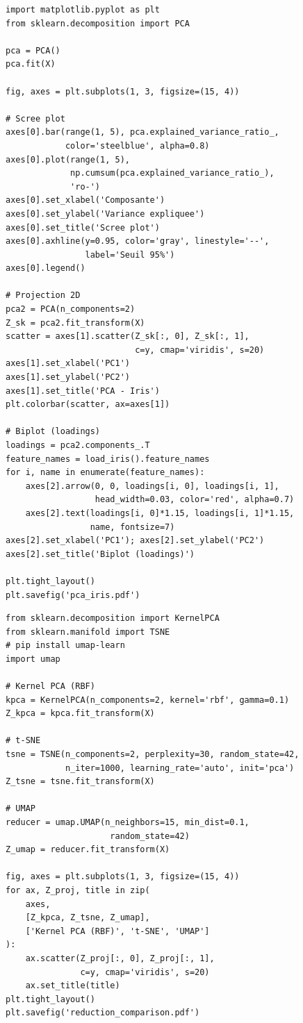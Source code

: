 \begin{codeblock}[title=\textbf{PCA avec scikit-learn et scree plot}]
\begin{verbatim}
import matplotlib.pyplot as plt
from sklearn.decomposition import PCA

pca = PCA()
pca.fit(X)

fig, axes = plt.subplots(1, 3, figsize=(15, 4))

# Scree plot
axes[0].bar(range(1, 5), pca.explained_variance_ratio_,
            color='steelblue', alpha=0.8)
axes[0].plot(range(1, 5),
             np.cumsum(pca.explained_variance_ratio_),
             'ro-')
axes[0].set_xlabel('Composante')
axes[0].set_ylabel('Variance expliquee')
axes[0].set_title('Scree plot')
axes[0].axhline(y=0.95, color='gray', linestyle='--',
                label='Seuil 95%')
axes[0].legend()

# Projection 2D
pca2 = PCA(n_components=2)
Z_sk = pca2.fit_transform(X)
scatter = axes[1].scatter(Z_sk[:, 0], Z_sk[:, 1],
                          c=y, cmap='viridis', s=20)
axes[1].set_xlabel('PC1')
axes[1].set_ylabel('PC2')
axes[1].set_title('PCA - Iris')
plt.colorbar(scatter, ax=axes[1])

# Biplot (loadings)
loadings = pca2.components_.T
feature_names = load_iris().feature_names
for i, name in enumerate(feature_names):
    axes[2].arrow(0, 0, loadings[i, 0], loadings[i, 1],
                  head_width=0.03, color='red', alpha=0.7)
    axes[2].text(loadings[i, 0]*1.15, loadings[i, 1]*1.15,
                 name, fontsize=7)
axes[2].set_xlabel('PC1'); axes[2].set_ylabel('PC2')
axes[2].set_title('Biplot (loadings)')

plt.tight_layout()
plt.savefig('pca_iris.pdf')
\end{verbatim}
\end{codeblock}

\begin{codeblock}[title=\textbf{Kernel PCA, t-SNE et UMAP}]
\begin{verbatim}
from sklearn.decomposition import KernelPCA
from sklearn.manifold import TSNE
# pip install umap-learn
import umap

# Kernel PCA (RBF)
kpca = KernelPCA(n_components=2, kernel='rbf', gamma=0.1)
Z_kpca = kpca.fit_transform(X)

# t-SNE
tsne = TSNE(n_components=2, perplexity=30, random_state=42,
            n_iter=1000, learning_rate='auto', init='pca')
Z_tsne = tsne.fit_transform(X)

# UMAP
reducer = umap.UMAP(n_neighbors=15, min_dist=0.1,
                     random_state=42)
Z_umap = reducer.fit_transform(X)

fig, axes = plt.subplots(1, 3, figsize=(15, 4))
for ax, Z_proj, title in zip(
    axes,
    [Z_kpca, Z_tsne, Z_umap],
    ['Kernel PCA (RBF)', 't-SNE', 'UMAP']
):
    ax.scatter(Z_proj[:, 0], Z_proj[:, 1],
               c=y, cmap='viridis', s=20)
    ax.set_title(title)
plt.tight_layout()
plt.savefig('reduction_comparison.pdf')
\end{verbatim}
\end{codeblock}

